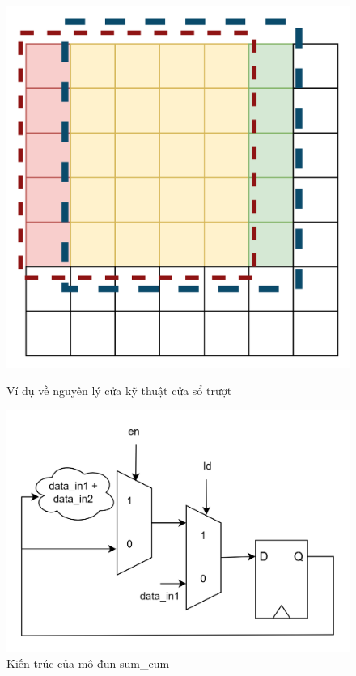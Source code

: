 \begin{figure}[!ht]
	\centering
	\begin{minipage}[t]{0.48\linewidth}
		\centering
		\includegraphics[width=\linewidth]{figures/slidingWindowPrincipla.png}
		\caption{Ví dụ về nguyên lý cửa kỹ thuật cửa sổ trượt}
		\label{fig:slidingWindowPrincipla}
	\end{minipage}
	\hfill
	\begin{minipage}[t]{0.48\linewidth}
		\centering
		\includegraphics[width=\linewidth]{figures/sumCumRTL.png}
		\caption{Kiến trúc của mô-đun sum\_cum}
		\label{fig:sumCumRTL}
	\end{minipage}
\end{figure}



